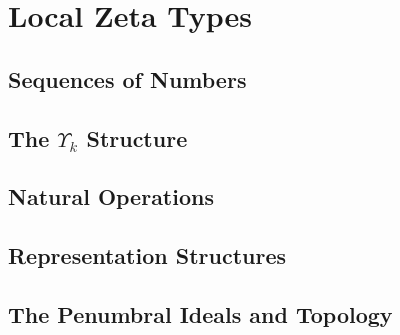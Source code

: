\section{Local Zeta Types}

\subsection{Sequences of Numbers}

\subsection{The $\Upsilon_k$ Structure}

\subsection{Natural Operations}

\subsection{Representation Structures}

\subsection{The Penumbral Ideals and Topology}

